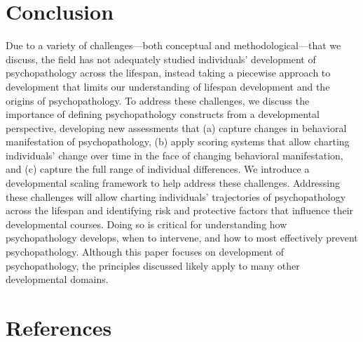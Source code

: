 \documentclass[
  american,
  letterpaper,
  12pt]{article}
\begin{document}
\section{Conclusion}\label{conclusion}

Due to a variety of challenges---both conceptual and
methodological---that we discuss, the field has not adequately studied
individuals' development of psychopathology across the lifespan, instead
taking a piecewise approach to development that limits our understanding
of lifespan development and the origins of psychopathology. To address
these challenges, we discuss the importance of defining psychopathology
constructs from a developmental perspective, developing new assessments
that (a) capture changes in behavioral manifestation of psychopathology,
(b) apply scoring systems that allow charting individuals' change over
time in the face of changing behavioral manifestation, and (c) capture
the full range of individual differences. We introduce a developmental
scaling framework to help address these challenges. Addressing these
challenges will allow charting individuals' trajectories of
psychopathology across the lifespan and identifying risk and protective
factors that influence their developmental courses. Doing so is critical
for understanding how psychopathology develops, when to intervene, and
how to most effectively prevent psychopathology. Although this paper
focuses on development of psychopathology, the principles discussed
likely apply to many other developmental domains.

\section{References}\label{references}
\end{document}
